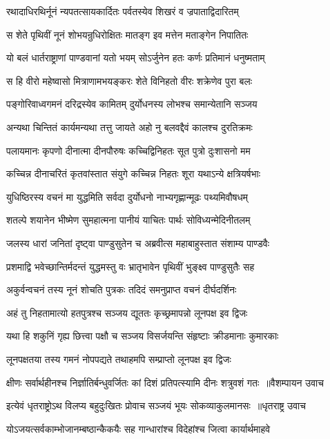 \twolineshloka
{रथादाधिरथिर्नूनं न्यपतत्सायकार्दितः}
{पर्वतस्येव शिखरं व ज्रपाताद्विदारितम्}


\twolineshloka
{स शेते पृथिवीं नूनं शोभयन्रुधिरोक्षितः}
{मातङ्ग इव मत्तेन मताङ्गेन निपातितः}


\twolineshloka
{यो बलं धार्तराष्ट्राणां पाण्डवानां यतो भयम्}
{सोऽर्जुनेन हतः कर्णः प्रतिमानं धनुष्मताम्}


\twolineshloka
{स हि वीरो महेष्वासो मित्राणामभयङ्करः}
{शेते विनिहतो वीरः शक्रेणेव पुरा बलः}


\twolineshloka
{पङ्गोरिवाध्वगमनं दरिद्रस्येव कामितम्}
{दुर्योधनस्य लोभश्च समान्येतानि सञ्जय}


\twolineshloka
{अन्यथा चिन्तितं कार्यमन्यथा तत्तु जायते}
{अहो नु बलवद्दैवं कालश्च दुरतिक्रमः}


\twolineshloka
{पलायमानः कृपणो दीनात्मा दीनपौरुषः}
{कच्चिद्विनिहतः सूत पुत्रो दुःशासनो मम}


\twolineshloka
{कच्चिन्न दीनाचरितं कृतवांस्तात संयुगे}
{कच्चिन्न निहतः शूरा यथाऽन्ये क्षत्रियर्षभाः}


\twolineshloka
{युधिष्ठिरस्य वचनं मा युद्धमिति सर्वदा}
{दुर्योधनो नाभ्यगृह्णान्मूढः पथ्यमिवौषधम्}


\twolineshloka
{शतल्पे शयानेन भीष्मेण सुमहात्मना}
{पानीयं याचितः पार्थः सोविध्यन्मेदिनीतलम्}


\twolineshloka
{जलस्य धारां जनितां दृष्ट्वा पाण्डुसुतेन च}
{अब्रवीत्स महाबाहुस्तात संशाम्य पाण्डवैः}


\twolineshloka
{प्रशमाद्वि भवेच्छान्तिर्मदन्तं युद्धमस्तु वः}
{भ्रातृभावेन पृथिवीं भुङ्क्ष्व पाण्डुसुतैः सह}


\twolineshloka
{अकुर्वन्वचनं तस्य नूनं शोचति पुत्रकः}
{तदिदं समनुप्राप्त वचनं दीर्घदर्शिनः}


\twolineshloka
{अहं तु निहतामात्यो हतपुत्रश्च सञ्जय}
{द्यूततः कृच्छ्रमापन्नो लूनपक्ष इव द्विजः}


\twolineshloka
{यथा हि शकुनिं गृह्य छित्त्वा पक्षौ च सञ्जय}
{विसर्जयन्ति संहृष्टाः क्रीडमानाः कुमारकाः}


\twolineshloka
{लूनपक्षतया तस्य गमनं नोपपद्यते}
{तथाहमपि सम्प्राप्तो लूनपक्ष इव द्विजः}


\threelineshloka
{क्षीणः सर्वार्थहीनश्च निर्ज्ञातिर्बन्धुवर्जितः}
{कां दिशं प्रतिपत्स्यामि दीनः शत्रुवशं गतः ॥वैशम्पायन उवाच}
{}


\threelineshloka
{इत्येवं धृतराष्ट्रोऽथ विलप्य बहुदुःखितः}
{प्रोवाच सञ्जयं भूयः सोकव्याकुलमानसः ॥धृतराष्ट्र उवाच}
{}


\twolineshloka
{योऽजयत्सर्वकाम्भोजानम्बष्ठान्कैकयैः सह}
{गान्धारांश्च विदेहांश्च जित्वा कार्यार्थमाहवे}


